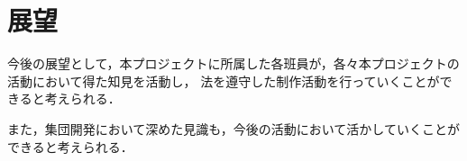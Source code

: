 \section{展望}

  今後の展望として，本プロジェクトに所属した各班員が，各々本プロジェクトの活動において得た知見を活動し，
  法を遵守した制作活動を行っていくことができると考えられる．

  また，集団開発において深めた見識も，今後の活動において活かしていくことができると考えられる．
  